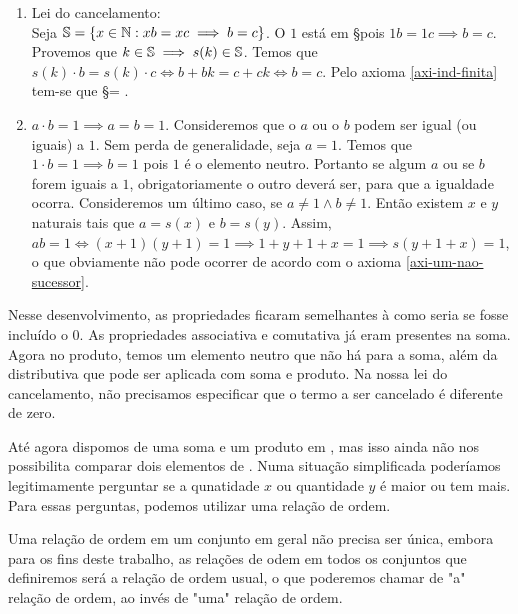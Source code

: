 \documentclass[../main.tex]{subfiles}
\begin{document}
\begin{dem}
\begin{enumerate}[label=(\roman*)]
        \item Lei do cancelamento: \\
            Seja $\S = \{ x \in \N : xb = xc \implies b = c\}$. O $1$ está em \S pois $1b = 1c \implies b = c$. Provemos que $k\in \S \implies s(k) \in \S$. Temos que $s(k) \cdot b = s(k) \cdot c \iff b + bk = c + ck \iff b = c$. Pelo axioma \ref{axi-ind-finita} tem-se que \S = \N.
        \item $a \cdot b = 1 \implies a = b = 1$.
            Consideremos que o $a$ ou o $b$ podem ser igual (ou iguais) a $1$.
            Sem perda de generalidade, seja $a = 1$. Temos que $1 \cdot b = 1 \implies b = 1$ pois $1$ é o elemento neutro. Portanto se algum $a$ ou se $b$ forem iguais a $1$, obrigatoriamente o outro deverá ser, para que a igualdade ocorra.
            Consideremos um último caso, se $a \neq 1 \land b \neq 1$. Então existem $x$ e $y$ naturais tais que $a = s(x)$ e $b = s(y)$.
            Assim, $ab=1 \iff (x+1) (y+1) = 1 \implies 1 + y + 1 + x = 1 \implies s(y + 1 + x) = 1$, o que obviamente não pode ocorrer de acordo com o axioma \ref{axi-um-nao-sucessor}.
    \end{enumerate}
\end{dem}

Nesse desenvolvimento, as propriedades ficaram semelhantes à como seria se fosse incluído o $0$. As propriedades associativa e comutativa já eram presentes na soma. Agora no produto, temos um elemento neutro que não há para a soma, além da distributiva que pode ser aplicada com soma e produto.
Na nossa lei do cancelamento, não precisamos especificar que o termo a ser cancelado é diferente de zero.


Até agora dispomos de uma soma e um produto em \N, mas isso ainda não nos possibilita comparar dois elementos de \N. Numa situação simplificada poderíamos legitimamente perguntar se a qunatidade $x$ ou quantidade $y$ é maior ou tem mais. Para essas perguntas, podemos utilizar uma relação de ordem.

Uma relação de ordem em um conjunto em geral não precisa ser única, embora para os fins deste trabalho, as relações de odem em todos os conjuntos que definiremos será a relação de ordem usual, o que poderemos chamar de "a" relação de ordem, ao invés de "uma" relação de ordem.
\end{document}
